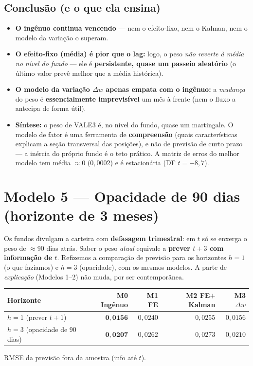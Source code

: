 \documentclass[11pt]{article}
\begin{document}
\subsection*{Conclusão (e o que ela ensina)}
\begin{itemize}
\item \textbf{O ingênuo continua vencendo} --- nem o efeito-fixo, nem o Kalman, nem o
modelo da variação o superam.
\item \textbf{O efeito-fixo (média) é pior que o lag:} logo, o peso \emph{não reverte à
média no nível do fundo} --- ele é \textbf{persistente, quase um passeio aleatório} (o
último valor prevê melhor que a média histórica).
\item \textbf{O modelo da variação $\Delta w$ apenas empata com o ingênuo:} a
\emph{mudança} do peso é \textbf{essencialmente imprevisível} um mês à frente (nem o
fluxo a antecipa de forma útil).
\item \textbf{Síntese:} o peso de VALE3 é, no nível do fundo, quase um martingale. O
modelo de fator é uma ferramenta de \textbf{compreensão} (quais características
explicam a seção transversal das posições), e não de previsão de curto prazo --- a
inércia do próprio fundo é o teto prático. A matriz de erros do melhor modelo tem
média $\approx 0$ ($0{,}0002$) e é estacionária (DF $t=-8{,}7$).
\end{itemize}

\section{Modelo 5 — Opacidade de 90 dias (horizonte de 3 meses)}

Os fundos divulgam a carteira com \textbf{defasagem trimestral}: em $t$ só se enxerga o
peso de $\approx$90 dias atrás. Saber o peso \emph{atual} equivale a \textbf{prever
$t+3$ com informação de $t$}. Refizemos a comparação de previsão para os horizontes
$h=1$ (o que fazíamos) e $h=3$ (opacidade), com os mesmos modelos. A parte de
\emph{explicação} (Modelos 1--2) não muda, por ser contemporânea.

\begin{table}[h]\centering
\begin{tabular}{@{}lrrrr@{}}
\toprule
Horizonte & M0 Ingênuo & M1 FE & M2 FE$+$Kalman & M3 $\Delta w$ \\
\midrule
$h=1$ (prever $t+1$)         & $\mathbf{0{,}0156}$ & $0{,}0240$ & $0{,}0255$ & $0{,}0156$ \\
$h=3$ (opacidade de 90 dias) & $\mathbf{0{,}0207}$ & $0{,}0262$ & $0{,}0273$ & $0{,}0210$ \\
\bottomrule
\end{tabular}
\end{table}
\noindent\footnotesize RMSE da previsão fora da amostra (info até $t$). \normalsize
\end{document}

